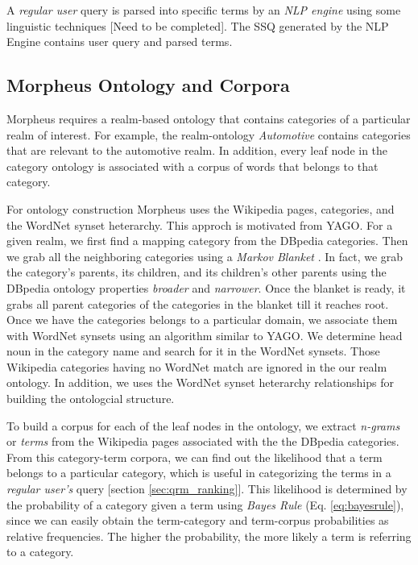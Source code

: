 A \textit{regular user} query is parsed into specific terms by an \textit{NLP
engine} using some linguistic techniques [Need to be completed]. The SSQ generated by the NLP
Engine contains user query and parsed terms. 


\subsection{Morpheus Ontology and Corpora} 
\label{sec:ontology_corpora}

Morpheus requires a realm-based ontology that contains categories of a
particular realm of interest. For example, the realm-ontology \textit{Automotive}
contains categories that are relevant to the automotive realm. In
addition, every leaf node in the category ontology is associated with a corpus of words
that belongs to that category. 

For ontology construction Morpheus uses the Wikipedia pages, categories,
and the WordNet synset heterarchy. This approch is motivated from
YAGO\cite{Suchanek2009phd}. For a given realm, we first find a mapping category 
from the DBpedia categories\cite{Bizer2009}. Then we grab all the neighboring categories using a \textit{Markov Blanket} \cite{PRIS}. In fact, we grab 
the category's parents, its children, and its 
children's other parents using the DBpedia ontology properties \textit{broader}
and \textit{narrower}. Once the blanket is ready, it grabs all parent categories
of the categories in the blanket till it reaches root. Once we have the
categories belongs to a particular domain, we associate them with WordNet synsets
using an algorithm similar to YAGO\cite{Suchanek2009phd}. We determine head noun in the
category name and search for it in the WordNet synsets.
Those Wikipedia categories having no WordNet match are ignored in the our realm
ontology. In addition, we uses the WordNet synset heterarchy relationships for building the ontologcial structure. 

To build a corpus for each of the leaf nodes in the ontology, 
we extract \emph{n-grams} or \emph{terms} from the Wikipedia pages associated with the 
the DBpedia categories\cite{Bizer2009}. From this category-term corpora, 
we can find out the likelihood that a term belongs to a particular category, 
which is useful in categorizing the terms in a \emph{regular user's} query [section \ref{sec:qrm_ranking}].    
This likelihood is determined by the probability of a category given a term 
using \textit{Bayes Rule} (Eq. \ref{eq:bayesrule}), since we can 
easily obtain the term-category and term-corpus probabilities as 
relative frequencies. The higher the probability, the more likely a 
term is referring to a category. 

